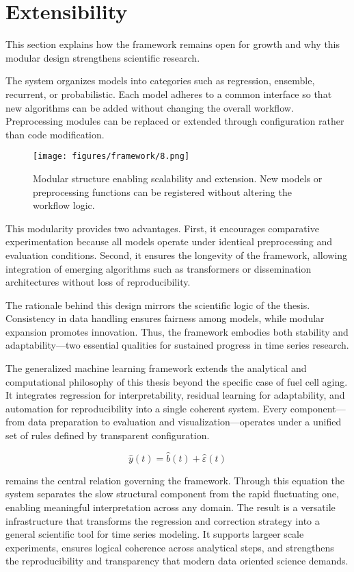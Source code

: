\section{Extensibility}

This section explains how the framework remains open for growth and why this modular design strengthens scientific research.

The system organizes models into categories such as regression, ensemble, recurrent, or probabilistic. Each model adheres to a common interface so that new algorithms can be added without changing the overall workflow. Preprocessing modules can be replaced or extended through configuration rather than code modification.

\begin{figure}[htbp]
\centering
\texttt{[image: figures/framework/8.png]}
\caption{Modular structure enabling scalability and extension. New models or preprocessing functions can be registered without altering the workflow logic.}
\label{fig:extensibility_general}
\end{figure}

This modularity provides two advantages. First, it encourages comparative experimentation because all models operate under identical preprocessing and evaluation conditions. Second, it ensures the longevity of the framework, allowing integration of emerging algorithms such as transformers or dissemination architectures without loss of reproducibility.

The rationale behind this design mirrors the scientific logic of the thesis. Consistency in data handling ensures fairness among models, while modular expansion promotes innovation. Thus, the framework embodies both stability and adaptability—two essential qualities for sustained progress in time series research.



The generalized machine learning framework extends the analytical and computational philosophy of this thesis beyond the specific case of fuel cell aging. It integrates regression for interpretability, residual learning for adaptability, and automation for reproducibility into a single coherent system. Every component—from data preparation to evaluation and visualization—operates under a unified set of rules defined by transparent configuration.

\[
\hat{y}(t) = \hat{b}(t) + \hat{\varepsilon}(t)
\]

remains the central relation governing the framework. Through this equation the system separates the slow structural component from the rapid fluctuating one, enabling meaningful interpretation across any domain. The result is a versatile infrastructure that transforms the regression and correction strategy into a general scientific tool for time series modeling. It supports largeer scale experiments, ensures logical coherence across analytical steps, and strengthens the reproducibility and transparency that modern data oriented science demands.


